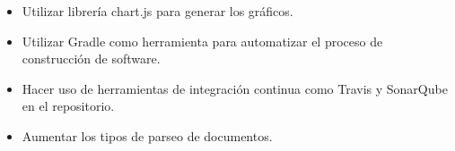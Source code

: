 \begin{itemize}
	\tightlist
	\item
	Utilizar librería chart.js para generar los gráficos.
	\item
	Utilizar Gradle como herramienta para automatizar el proceso de
	construcción de software.
	\item
	Hacer uso de herramientas de integración continua como Travis y
	SonarQube en el repositorio.
	\item
	Aumentar los tipos de parseo de documentos.
	
\end{itemize}
